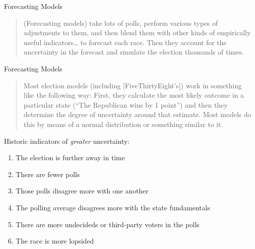 \documentclass[ignorenonframetext,]{beamer}
\providecommand{\tightlist}{%
  \setlength{\itemsep}{0pt}\setlength{\parskip}{0pt}}
\begin{document}
\begin{frame}{Forecasting Models}
\protect\hypertarget{forecasting-models}{}

\begin{quote}
(Forecasting models) take lots of polls, perform various types of
adjustments to them, and then blend them with other kinds of empirically
useful indicators\ldots{} to forecast each race. Then they account for
the uncertainty in the forecast and simulate the election thousands of
times.
\end{quote}

\end{frame}

\begin{frame}{Forecasting Models}
\protect\hypertarget{forecasting-models-1}{}

\begin{quote}
Most election models (including {[}FiveThirtyEight's{]}) work in
something like the following way: First, they calculate the most likely
outcome in a particular state (``The Republican wins by 1 point'') and
then they determine the degree of uncertainty around that estimate. Most
models do this by means of a normal distribution or something similar to
it.
\end{quote}

Historic indicators of \emph{greater} uncertainty:

\begin{enumerate}
\tightlist
\item
  The election is further away in time
\item
  There are fewer polls
\item
  Those polls disagree more with one another
\item
  The polling average disagrees more with the state fundamentals
\item
  There are more undecideds or third-party voters in the polls
\item
  The race is more lopsided
\end{enumerate}

\end{frame}
\end{document}
